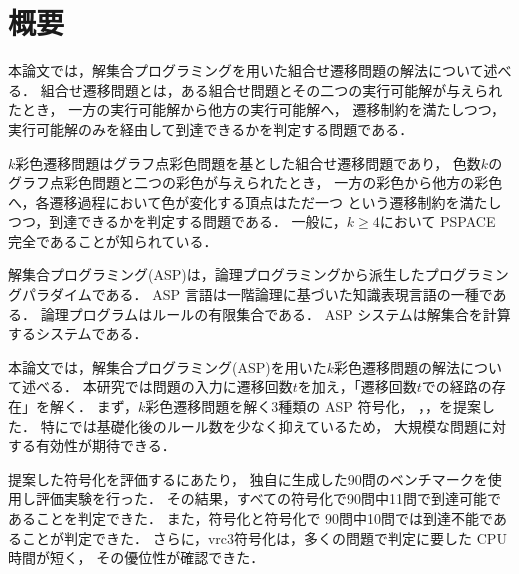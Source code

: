 \chapter*{概要}

本論文では，解集合プログラミングを用いた組合せ遷移問題の解法について述べる．
組合せ遷移問題とは，ある組合せ問題とその二つの実行可能解が与えられたとき，
一方の実行可能解から他方の実行可能解へ，
遷移制約を満たしつつ，実行可能解のみを経由して到達できるかを判定する問題である．

$k$彩色遷移問題はグラフ点彩色問題を基とした組合せ遷移問題であり，
色数$k$のグラフ点彩色問題と二つの彩色が与えられたとき，
一方の彩色から他方の彩色へ，各遷移過程において色が変化する頂点はただ一つ
という遷移制約を満たしつつ，到達できるかを判定する問題である．
一般に，$k \ge 4$において PSPACE 完全であることが知られている．

解集合プログラミング(ASP)は，論理プログラミングから派生したプログラミングパラダイムである．
ASP 言語は一階論理に基づいた知識表現言語の一種である．
論理プログラムはルールの有限集合である．
ASP システムは解集合を計算するシステムである．

本論文では，解集合プログラミング(ASP)を用いた$k$彩色遷移問題の解法について述べる．
本研究では問題の入力に遷移回数$t$を加え，「遷移回数$t$での経路の存在」を解く．
まず，$k$彩色遷移問題を解く3種類の ASP 符号化，
，，を提案した．
特にでは基礎化後のルール数を少なく抑えているため，
大規模な問題に対する有効性が期待できる．

提案した符号化を評価するにあたり，
独自に生成した90問のベンチマークを使用し評価実験を行った．
その結果，すべての符号化で90問中11問で到達可能であることを判定できた．
また，符号化と符号化で
90問中10問では到達不能であることが判定できた．
さらに，\textsf{vrc3}符号化は，多くの問題で判定に要した CPU 時間が短く，
その優位性が確認できた．

